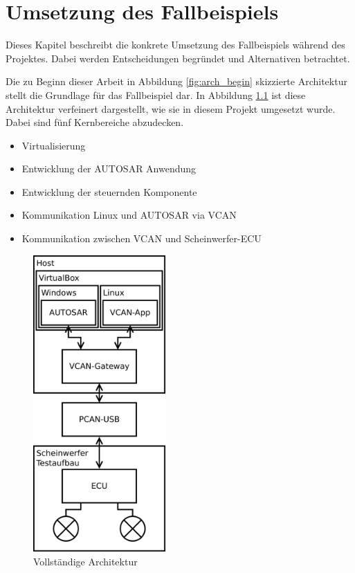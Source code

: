 \documentclass[
  a4paper,					    %
  twoside,
  DIV=calc,     				%
  bibliography=totoc,
  cleardoublepage=empty,
  ngerman,     					%
  final       					%
]{scrbook}
\begin{document}
\chapter{Umsetzung des Fallbeispiels}
\label{sec:Umsetzung_Fallbeispiel}
Dieses Kapitel beschreibt die konkrete Umsetzung des Fallbeispiels während des Projektes. Dabei werden Entscheidungen begründet und Alternativen betrachtet.

Die zu Beginn dieser Arbeit in Abbildung \ref{fig:arch_begin} skizzierte Architektur stellt die Grundlage für das Fallbeispiel dar. In Abbildung \ref{fig:arch_finished} ist diese Architektur verfeinert dargestellt, wie sie in diesem Projekt umgesetzt wurde. Dabei sind fünf Kernbereiche abzudecken.

\begin{itemize}
    \item Virtualisierung
    \item Entwicklung der AUTOSAR Anwendung
    \item Entwicklung der steuernden Komponente
    \item Kommunikation Linux und AUTOSAR via VCAN
    \item Kommunikation zwischen VCAN und Scheinwerfer-ECU
\end{itemize}

\begin{figure}[ht]
    \centering
    \includegraphics[width=0.45\textwidth]{arch_finished}
    \caption{Vollständige Architektur}
    \label{fig:arch_finished}
\end{figure}
\end{document}
